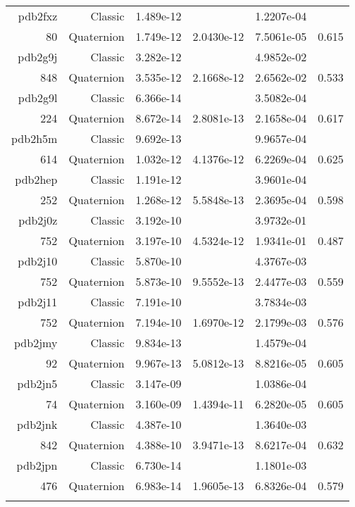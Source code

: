 \begin{xltabular}{\textwidth}{r|rS[table-format=1.3e+2]S[table-format=1.4e+2]S[table-format=1.4e+2]S[table-format=-1.3]}
pdb2fxz & Classic & 1.489e-12 &  & 1.2207e-04 & \\
80 & Quaternion & 1.749e-12 & 2.0430e-12 & 7.5061e-05 & 0.615\\  \addlinespace
{\color{red} pdb2g9j } & Classic & 3.282e-12 &  & 4.9852e-02 & \\
848 & Quaternion & 3.535e-12 & 2.1668e-12 & 2.6562e-02 & 0.533\\  \addlinespace
pdb2g9l & Classic & 6.366e-14 &  & 3.5082e-04 & \\
224 & Quaternion & 8.672e-14 & 2.8081e-13 & 2.1658e-04 & 0.617\\  \addlinespace
pdb2h5m & Classic & 9.692e-13 &  & 9.9657e-04 & \\
614 & Quaternion & 1.032e-12 & 4.1376e-12 & 6.2269e-04 & 0.625\\  \addlinespace
pdb2hep & Classic & 1.191e-12 &  & 3.9601e-04 & \\
252 & Quaternion & 1.268e-12 & 5.5848e-13 & 2.3695e-04 & 0.598\\  \addlinespace
{\color{red} pdb2j0z } & Classic & 3.192e-10 &  & 3.9732e-01 & \\
752 & Quaternion & 3.197e-10 & 4.5324e-12 & 1.9341e-01 & 0.487\\  \addlinespace
{\color{red} pdb2j10 } & Classic & 5.870e-10 &  & 4.3767e-03 & \\
752 & Quaternion & 5.873e-10 & 9.5552e-13 & 2.4477e-03 & 0.559\\  \addlinespace
{\color{red} pdb2j11 } & Classic & 7.191e-10 &  & 3.7834e-03 & \\
752 & Quaternion & 7.194e-10 & 1.6970e-12 & 2.1799e-03 & 0.576\\  \addlinespace
pdb2jmy & Classic & 9.834e-13 &  & 1.4579e-04 & \\
92 & Quaternion & 9.967e-13 & 5.0812e-13 & 8.8216e-05 & 0.605\\  \addlinespace
pdb2jn5 & Classic & 3.147e-09 &  & 1.0386e-04 & \\
74 & Quaternion & 3.160e-09 & 1.4394e-11 & 6.2820e-05 & 0.605\\  \addlinespace
pdb2jnk & Classic & 4.387e-10 &  & 1.3640e-03 & \\
842 & Quaternion & 4.388e-10 & 3.9471e-13 & 8.6217e-04 & 0.632\\  \addlinespace
pdb2jpn & Classic & 6.730e-14 &  & 1.1801e-03 & \\
476 & Quaternion & 6.983e-14 & 1.9605e-13 & 6.8326e-04 & 0.579\\  \addlinespace

\end{xltabular}
